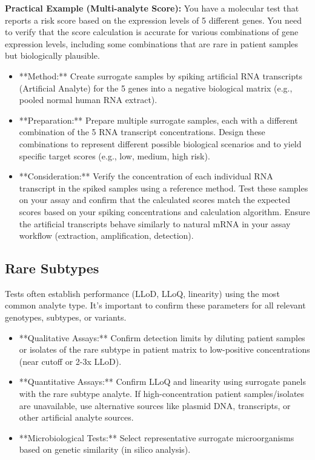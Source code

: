 \documentclass{article}
\begin{document}
\textbf{Practical Example (Multi-analyte Score):}
You have a molecular test that reports a risk score based on the expression levels of 5 different genes. You need to verify that the score calculation is accurate for various combinations of gene expression levels, including some combinations that are rare in patient samples but biologically plausible.
\begin{itemize}
    \item **Method:** Create surrogate samples by spiking artificial RNA transcripts (Artificial Analyte) for the 5 genes into a negative biological matrix (e.g., pooled normal human RNA extract).
    \item **Preparation:** Prepare multiple surrogate samples, each with a different combination of the 5 RNA transcript concentrations. Design these combinations to represent different possible biological scenarios and to yield specific target scores (e.g., low, medium, high risk).
    \item **Consideration:** Verify the concentration of each individual RNA transcript in the spiked samples using a reference method. Test these samples on your assay and confirm that the calculated scores match the expected scores based on your spiking concentrations and calculation algorithm. Ensure the artificial transcripts behave similarly to natural mRNA in your assay workflow (extraction, amplification, detection).
\end{itemize}

\subsection{Rare Subtypes}

Tests often establish performance (LLoD, LLoQ, linearity) using the most common analyte type. It's important to confirm these parameters for all relevant genotypes, subtypes, or variants.

\begin{itemize}
    \item **Qualitative Assays:** Confirm detection limits by diluting patient samples or isolates of the rare subtype in patient matrix to low-positive concentrations (near cutoff or 2-3x LLoD).
    \item **Quantitative Assays:** Confirm LLoQ and linearity using surrogate panels with the rare subtype analyte. If high-concentration patient samples/isolates are unavailable, use alternative sources like plasmid DNA, transcripts, or other artificial analyte sources.
    \item **Microbiological Tests:** Select representative surrogate microorganisms based on genetic similarity (in silico analysis).
\end{itemize}
\end{document}
